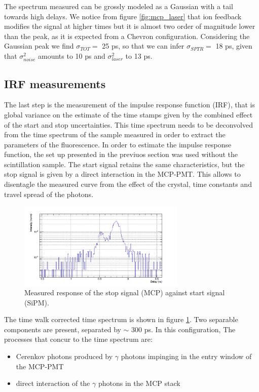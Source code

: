 The spectrum measured can be grossly modeled as a Gaussian with a tail towards high delays. 
We notice from figure \ref{fig:mcp_laser} that ion feedback modifies the signal at higher times but it is almost two order of magnitude lower than the peak, as it is expected from a Chevron configuration. Considering the Gaussian peak we find $\sigma _{TOT} =$ 25 ps, so that we can infer    $\sigma _{SPTR} = $ 18 ps, given that $\sigma _{noise}^{2}$ amounts to 10 ps and $\sigma _{laser}^{2}$ to 13 ps.

\subsection{IRF measurements}
The last step is the measurement of the impulse response function (IRF), that is global variance on the estimate of the time stamps given by the combined effect of the start and stop uncertainties. This time spectrum needs to be deconvolved from the time spectrum of the sample measured in order to extract the parameters of the fluorescence.
In order to estimate the impulse response function, the set up presented in the previuos section was used without the scintillation sample. The start signal retains the same characteristics, but the stop signal is given by a direct interaction in the MCP-PMT. This allows to disentagle the measured curve from the effect of the crystal, time constants and travel spread of the photons.
\begin{figure}[htbp]
\begin{center}
\includegraphics[width=8cm]{../Pictures/Chapter_8/response_cer_10}
\end{center}
\caption[Corrected IRF]{Measured response of the stop signal (MCP) against start signal (SiPM).}
\label{fig:ceren_10}
\end{figure}
The time walk corrected time spectrum is shown in figure \ref{fig:ceren_10}. Two separable components are present, separated by $\sim$ 300 ps. %
In this configuration, The processes that concur to the time spectrum are:
\begin{itemize}
\item Cerenkov photons produced by $\gamma$ photons impinging in the entry window of the MCP-PMT
\item direct interaction of the $\gamma$ photons in the MCP stack
\end{itemize}
